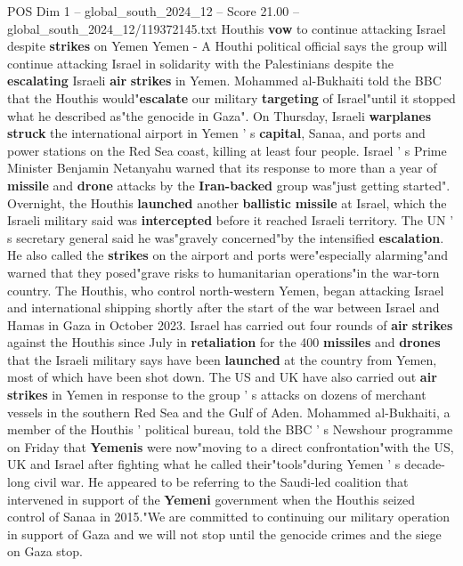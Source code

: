 \begin{textsample}{POS Dim 1 – global\_south\_2024\_12 – Score 21.00 – global\_south\_2024\_12/119372145.txt}  \label{ex:f1_pos_193}
Houthis \textbf{vow} to continue attacking Israel despite \textbf{strikes} on Yemen Yemen - A Houthi political official says the group will continue attacking Israel in solidarity with the Palestinians despite the \textbf{escalating} Israeli \textbf{air} \textbf{strikes} in Yemen.
Mohammed al-Bukhaiti told the BBC that the Houthis would"\textbf{escalate} our military \textbf{targeting} of Israel"until it stopped what he described as"the genocide in Gaza".
On Thursday, Israeli \textbf{warplanes} \textbf{struck} the international airport in Yemen ' s \textbf{capital}, Sanaa, and ports and power stations on the Red Sea coast, killing at least four people.
Israel ' s Prime Minister Benjamin Netanyahu warned that its response to more than a year of \textbf{missile} and \textbf{drone} attacks by the \textbf{Iran-backed} group was"just getting started".
Overnight, the Houthis \textbf{launched} another \textbf{ballistic} \textbf{missile} at Israel, which the Israeli military said was \textbf{intercepted} before it reached Israeli territory.
The UN ' s secretary general said he was"gravely concerned"by the intensified \textbf{escalation}.
He also called the \textbf{strikes} on the airport and ports were"especially alarming"and warned that they posed"grave risks to humanitarian operations"in the war-torn country.
The Houthis, who control north-western Yemen, began attacking Israel and international shipping shortly after the start of the war between Israel and Hamas in Gaza in October 2023.
Israel has carried out four rounds of \textbf{air} \textbf{strikes} against the Houthis since July in \textbf{retaliation} for the 400 \textbf{missiles} and \textbf{drones} that the Israeli military says have been \textbf{launched} at the country from Yemen, most of which have been shot down.
The US and UK have also carried out \textbf{air} \textbf{strikes} in Yemen in response to the group ' s attacks on dozens of merchant vessels in the southern Red Sea and the Gulf of Aden.
Mohammed al-Bukhaiti, a member of the Houthis ' political bureau, told the BBC ' s Newshour programme on Friday that \textbf{Yemenis} were now"moving to a direct confrontation"with the US, UK and Israel after fighting what he called their"tools"during Yemen ' s decade-long civil war.
He appeared to be referring to the Saudi-led coalition that intervened in support of the \textbf{Yemeni} government when the Houthis seized control of Sanaa in 2015."We are committed to continuing our military operation in support of Gaza and we will not stop until the genocide crimes and the siege on Gaza stop.

\end{textsample}
